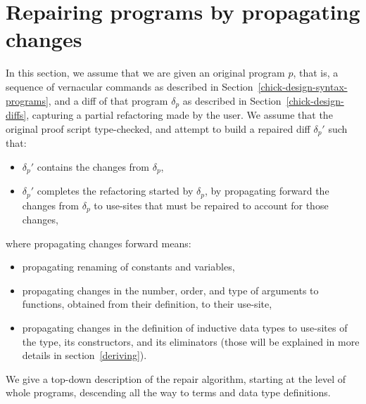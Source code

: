 \section{Repairing programs by propagating changes} \label{chick-design-repair}

In this section, we assume that we are given an original program $p$, that is, a
sequence of vernacular commands as described in
Section~\ref{chick-design-syntax-programs}, and a diff of that program
$\delta_p$ as described in Section~\ref{chick-design-diffs}, capturing a partial
refactoring made by the user.  We assume that the original proof script
type-checked, and attempt to build a repaired diff $\delta_p'$ such that:

\begin{itemize}

\item $\delta_p'$ contains the changes from $\delta_p$,

\item $\delta_p'$ completes the refactoring started by $\delta_p$, by
propagating forward the changes from $\delta_p$ to use-sites that must be
repaired to account for those changes,

\end{itemize}
%
where propagating changes forward means:

\begin{itemize}

\item propagating renaming of constants and variables,

\item propagating changes in the number, order, and type of arguments to
functions, obtained from their definition, to their use-site,

\item propagating changes in the definition of inductive data types to use-sites
of the type, its constructors, and its eliminators (those will be explained in
more details in section~\ref{deriving}).

\end{itemize}

We give a top-down description of the repair algorithm, starting at the level of
whole programs, descending all the way to terms and data type definitions.







